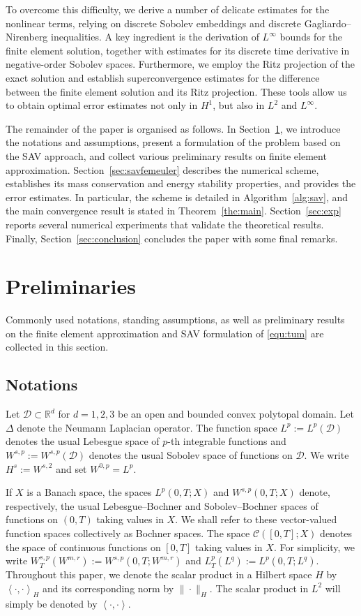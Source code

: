 \documentclass[11pt, reqno]{amsart}
\theoremstyle{definition}
\numberwithin{equation}{section}
\newcommand{\bb}{\mathbb}
\newcommand{\inpro}[2]{\left\langle#1,#2\right\rangle}
\begin{document}
To overcome this difficulty, we derive a number of delicate estimates for the nonlinear terms, relying on discrete Sobolev embeddings and discrete Gagliardo--Nirenberg inequalities. A key ingredient is the derivation of $L^\infty$ bounds for the finite element solution, together with estimates for its discrete time derivative in negative-order Sobolev spaces. Furthermore, we employ the Ritz projection of the exact solution and establish superconvergence estimates for the difference between the finite element solution and its Ritz projection. These tools allow us to obtain optimal error estimates not only in $H^1$, but also in $L^2$ and $L^\infty$.


The remainder of the paper is organised as follows. In Section~\ref{sec:prelim}, we introduce the notations and assumptions, present a formulation of the problem based on the SAV approach, and collect various preliminary results on finite element approximation. Section~\ref{sec:savfemeuler} describes the numerical scheme, establishes its mass conservation and energy stability properties, and provides the error estimates. In particular, the scheme is detailed in Algorithm~\ref{alg:sav}, and the main convergence result is stated in Theorem~\ref{the:main}. Section~\ref{sec:exp} reports several numerical experiments that validate the theoretical results. Finally, Section~\ref{sec:conclusion} concludes the paper with some final remarks.


\section{Preliminaries}\label{sec:prelim}

Commonly used notations, standing assumptions, as well as preliminary results on the finite element approximation and SAV formulation of \eqref{equ:tum} are collected in this section.


\subsection{Notations}
Let $\mathscr{D}\subset \bb{R}^d$ for $d=1,2,3$
be an open and bounded convex polytopal domain. Let $\Delta$ denote the Neumann Laplacian operator. The function space $L^p := L^p(\mathscr{D})$ denotes the usual Lebesgue space of $p$-th integrable functions and $W^{s,p} := W^{s,p}(\mathscr{D})$ denotes the usual Sobolev space of 
functions on $\mathscr{D}$. We
write $H^s := W^{s,2}$ and set $W^{0,p}=L^p$.

{If $X$ is a Banach space, the spaces $L^p(0,T;X)$ and $W^{s,p}(0,T;X)$ denote, respectively, the usual Lebesgue--Bochner and Sobolev--Bochner spaces of functions on $(0,T)$ taking values in $X$. We shall refer to these vector-valued function spaces collectively as Bochner spaces.} The space $\mathcal{C}([0,T];X)$ denotes the space of continuous functions on $[0,T]$ taking values in $X$. For simplicity, we write $W^{s,p}_T(W^{m,r}) := W^{s,p}(0,T; W^{m,r})$ and $L^p_T(L^q) := L^p(0,T; L^q)$. Throughout this paper, we denote the scalar product in a Hilbert space $H$ by $\inpro{\cdot}{\cdot}_H$ and its corresponding norm by $\|\cdot\|_H$. The scalar product in $L^2$ will simply be denoted by $\inpro{\cdot}{\cdot}$.
\end{document}
